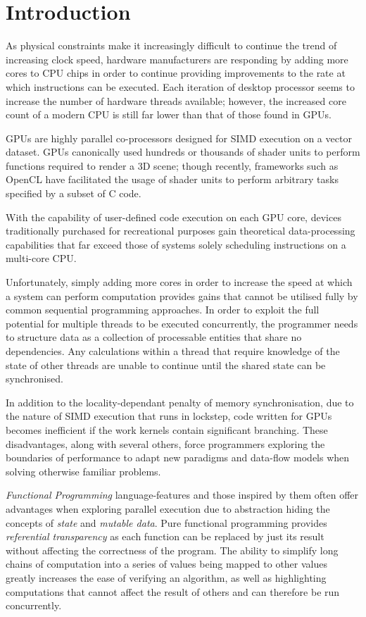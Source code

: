 \section{Introduction}
  As physical constraints make it increasingly difficult to continue the trend of increasing clock speed, hardware manufacturers are responding by adding more cores to \ac{CPU} chips in order to continue providing improvements to the rate at which instructions can be executed. \cite{perf}
  Each iteration of desktop processor seems to increase the number of hardware threads available; however, the increased core count of a modern \ac{CPU} is still far lower than that of those found in \ac{GPUs}.

\ac{GPUs} are highly parallel co-processors designed for \ac{SIMD} execution on a vector dataset.
\ac{GPUs} canonically used hundreds or thousands of shader units to perform functions required to render a 3D scene; though recently, frameworks such as \ac{OpenCL} have facilitated the usage of shader units to perform arbitrary tasks specified by a subset of C code.

 With the capability of user-defined code execution on each GPU core, devices traditionally purchased for recreational purposes gain theoretical data-processing capabilities that far exceed those of systems solely scheduling instructions on a multi-core \ac{CPU}. \cite{mars}

Unfortunately, simply adding more cores in order to increase the speed at which a system can perform computation provides gains that cannot be utilised fully by common sequential programming approaches.
In order to exploit the full potential for multiple threads to be executed concurrently, the programmer needs to structure data as a collection of processable entities that share no dependencies.
Any calculations within a thread that require knowledge of the state of other threads are unable to continue until the shared state can be synchronised.

In addition to the locality-dependant penalty of memory synchronisation, due to the nature of \ac{SIMD} execution that runs in lockstep, code written for \ac{GPUs} becomes inefficient if the work kernels contain significant branching. \cite{branching}
These disadvantages, along with several others, force programmers exploring the boundaries of performance to adapt new paradigms and data-flow models when solving otherwise familiar problems.

\emph{Functional Programming} language-features and those inspired by them often offer advantages when exploring parallel execution \cite{parallelfunction} due to abstraction hiding the concepts of \emph{state} and \emph{mutable data}.
Pure functional programming provides \emph{referential transparency} as each function can be replaced by just its result without affecting the correctness of the program.
The ability to simplify long chains of computation into a series of values being mapped to other values greatly increases the ease of verifying an algorithm, as well as highlighting computations that cannot affect the result of others and can therefore be run concurrently.

